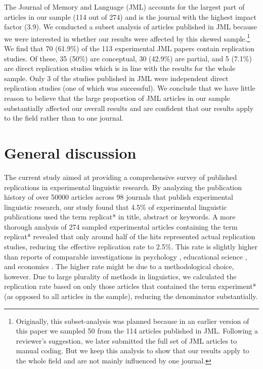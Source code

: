 \documentclass[cm,linguex]{glossa}
\begin{document}
The Journal of Memory and Language (JML) accounts for the largest part of articles in our sample (114 out of 274) and is the journal with the highest impact factor (3.9). We conducted a subset analysis of articles published in JML because we were interested in whether our results were affected by this skewed sample.\footnote{Originally, this subset-analysis was planned because in an earlier version of this paper we sampled 50 from the 114 articles published in JML. Following a reviewer's suggestion, we later submitted the full set of JML articles to manual coding. But we keep this analysis to show that our results apply to the whole field and are not mainly influenced by one journal.} We find that 70 (61.9\%) of the 113 experimental JML papers contain replication studies. Of these, 35 (50\%) are conceptual, 30 (42.9\%) are partial, and 5 (7.1\%) are direct replication studies which is in line with the results for the whole sample. Only 3 of the studies published in JML were independent direct replication studies (one of which was successful). We conclude that we have little reason to believe that the large proportion of JML articles in our sample substantially affected our overall results and are confident that our results apply to the field rather than to one journal.

\hypertarget{general-discussion}{%
\section{General discussion}\label{general-discussion}}

The current study aimed at providing a comprehensive survey of published replications in experimental linguistic research.
By analyzing the publication history of over 50000 articles across 98 journals that publish experimental linguistic research, our study found that 4.5\% of experimental linguistic publications used the term replicat* in title, abstract or keywords.
A more thorough analysis of 274 sampled experimental articles containing the term replicat* revealed that only around half of the hits represented actual replication studies, reducing the effective replication rate to 2.5\%. This rate is slightly higher than reports of comparable investigations in psychology \citep[1.6\%,][]{makel_replications_2012}, educational science \citep[0.1\%,][]{makel_facts_2014}, and economics \citep[0.1\%,][]{mueller2019replication}. The higher rate might be due to a methodological choice, however. Due to large plurality of methods in linguistics, we calculated the replication rate based on only those articles that contained the term experiment* (as opposed to all articles in the sample), reducing the denominator substantially.
\end{document}
